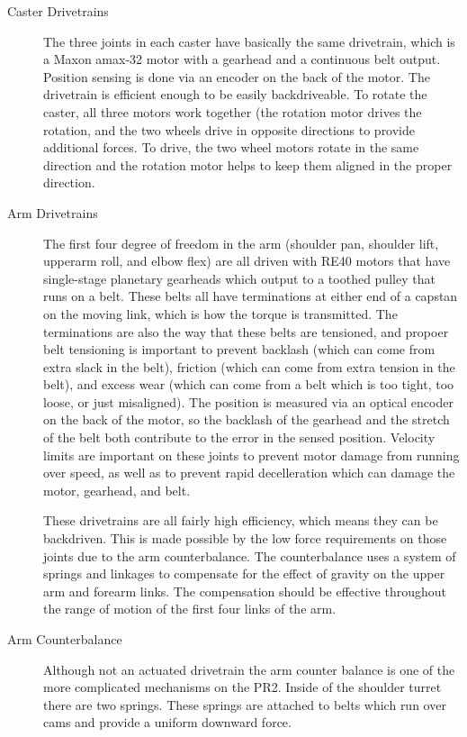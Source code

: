 \begin{description}
\item[Caster Drivetrains] The three joints in each caster have basically the
  same drivetrain, which is a Maxon amax-32 motor with a gearhead and a
  continuous belt output.  Position sensing is done via an encoder on the back
  of the motor.  The drivetrain is efficient enough to be easily backdriveable.
  To rotate the caster, all three motors work together (the rotation motor
  drives the rotation, and the two wheels drive in opposite directions to
  provide additional forces.  To drive, the two wheel motors rotate in the same
  direction and the rotation motor helps to keep them aligned in the proper
  direction.

\item[Arm Drivetrains] The first four degree of freedom in the arm (shoulder
  pan, shoulder lift, upperarm roll, and elbow flex) are all driven with RE40
  motors that have single-stage planetary gearheads which output to a toothed
  pulley that runs on a belt.  These belts all have terminations at either end
  of a capstan on the moving link, which is how the torque is transmitted.  The
  terminations are also the way that these belts are tensioned, and propoer belt
  tensioning is important to prevent backlash (which can come from extra slack
  in the belt), friction (which can come from extra tension in the belt), and
  excess wear (which can come from a belt which is too tight, too loose, or just
  misaligned).  The position is measured via an optical encoder on the back of
  the motor, so the backlash of the gearhead and the stretch of the belt both
  contribute to the error in the sensed position.  Velocity limits are important
  on these joints to prevent motor damage from running over speed, as well as to
  prevent rapid decelleration which can damage the motor, gearhead, and belt.

These drivetrains are all fairly high efficiency, which means they can be
backdriven.  This is made possible by the low force requirements on those joints
due to the arm counterbalance.  The counterbalance uses a system of springs and
linkages to compensate for the effect of gravity on the upper arm and forearm
links.  The compensation should be effective throughout the range of motion of
the first four links of the arm.

\item[Arm Counterbalance] Although not an actuated drivetrain the arm counter
  balance is one of the more complicated mechanisms on the PR2. Inside of the
  shoulder turret there are two springs.  These springs are attached to belts
  which run over cams and provide a uniform downward force.


\end{description}
